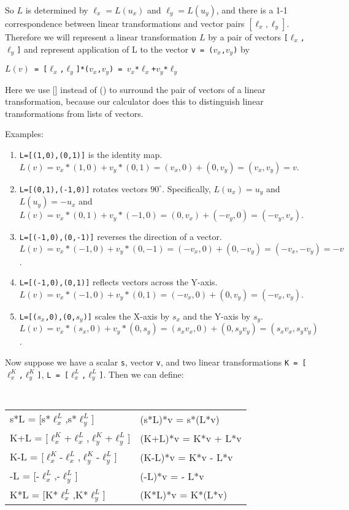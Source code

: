 \documentclass[12pt]{article}
\begin{document}
So $L$ is determined by $\ell_x = L(u_x)$ and $\ell_y = L(u_y)$,
and there is a 1-1 correspondence between linear transformations
and vector pairs $[\ell_x,\ell_y]$.  Therefore we will represent a linear
transformation $L$ by a pair of vectors {\tt [$\ell_x$,$\ell_y$]}
and represent application of L to the vector {\tt v = ($v_x$,$v_y$)} by \\
\centerline{\tt $L(v)$ = [$\ell_x$,$\ell_y$]*($v_x$,$v_y$) =
             $v_x$*$\ell_x$+$v_y$*$\ell_y$}
Here we use [] instead of () to surround the pair of vectors of a linear
transformation, because our calculator does this to distinguish linear
transformations from lists of vectors.

Examples:
\begin{enumerate}
\item {\tt L=[(1,0),(0,1)]} is the identity map.
$L(v)=v_x*(1,0) + v_y*(0,1) = (v_x,0)+(0,v_y) = (v_x,v_y) = v$.
\item {\tt L=[(0,1),(-1,0)]} rotates vectors $90^\circ$.
Specifically, $L(u_x)=u_y$ and $L(u_y)=-u_x$ and
$L(v)=v_x*(0,1) + v_y*(-1,0) = (0,v_x)+(-v_y,0) = (-v_y,v_x)$.
\item {\tt L=[(-1,0),(0,-1)]} reverses the direction of a vector.
$L(v)=v_x*(-1,0) + v_y*(0,-1) = (-v_x,0)+(0,-v_y) = (-v_x,-v_y) = -v$.
\item {\tt L=[(-1,0),(0,1)]} reflects vectors across the Y-axis.
$L(v)=v_x*(-1,0) + v_y*(0,1) = (-v_x,0)+(0,v_y) = (-v_x,v_y)$.
\item {\tt L=[($s_x$,0),(0,$s_y$)]} scales the X-axis by $s_x$ and
the Y-axis by $s_y$. \\
$L(v)=v_x*(s_x,0) + v_y*(0,s_y)
     = (s_x v_x,0)+(0,s_y v_y)= (s_x v_x, s_y v_y)$.
\end{enumerate}

Now suppose we have a scalar {\tt s}, vector {\tt v},
and two linear transformations
{\tt K = [$\ell^K_x$,$\ell^K_y$]},
{\tt L = [$\ell^L_x$,$\ell^L_y$]}.  Then we can define:
\begin{center}
\tt
\begin{tabular}{l@{~so that~}l}
s*L = [s*$\ell^L_x$,s*$\ell^L_y$]
	 & (s*L)*v = s*(L*v) \\[0.3ex]
K+L = [$\ell^K_x$+$\ell^L_x$,$\ell^K_y$+$\ell^L_y$]
	 & (K+L)*v = K*v + L*v \\[0.3ex]
K-L = [$\ell^K_x$-$\ell^L_x$,$\ell^K_y$-$\ell^L_y$]
	 & (K-L)*v = K*v - L*v \\[0.3ex]
-L = [-$\ell^L_x$,-$\ell^L_y$]
	 & (-L)*v = - L*v \\[0.3ex]
K*L = [K*$\ell^L_x$,K*$\ell^L_y$]
	 & (K*L)*v = K*(L*v)
\end{tabular}
\end{center}
\end{document}
